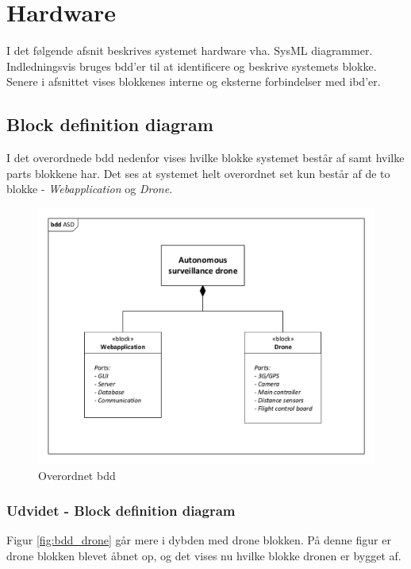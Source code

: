 \section{Hardware}
I det følgende afsnit beskrives systemet hardware vha. SysML diagrammer. 
Indledningsvis bruges bdd'er til at identificere og beskrive systemets blokke. Senere i afsnittet vises blokkenes interne og eksterne forbindelser med ibd'er.

\subsection{Block definition diagram}
I det overordnede bdd nedenfor vises hvilke blokke systemet består af samt hvilke parts blokkene har. Det ses at systemet helt overordnet set kun består af de to blokke - \textit{Webapplication} og \textit{Drone}. 

\begin{figure}[H]
\centering
\includegraphics[width=1\textwidth]{Billeder/BDD/bdd_overordnet.pdf}
\caption{Overordnet bdd}
\label{fig:bdd_overordnet}
\end{figure}

\newpage
\subsubsection{Udvidet - Block definition diagram}
Figur \ref{fig:bdd_drone} går mere i dybden med drone blokken. På denne figur er drone blokken blevet åbnet op, og det vises nu hvilke blokke dronen er bygget af. 

